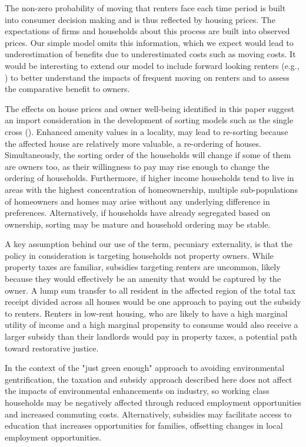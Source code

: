 \documentclass[ecta,nameyear,draft]{econsocart}
\theoremstyle{plain}
\theoremstyle{remark}
\begin{document}
The non-zero probability of moving that renters face each time period is built into consumer decision making and is thus reflected by housing prices. The expectations of firms and households about this process are built into observed prices. Our simple model omits this information, which we expect would lead to underestimation of benefits due to underestimated costs such as moving costs. It would be interesting to extend our model to include forward looking renters (e.g., \cite{bishop19}) to better understand the impacts of frequent moving on renters and to assess the comparative benefit to owners.  

The effects on house prices and owner well-being identified in this paper suggest an import consideration in the development of sorting models such as the single cross (\cite{banzhaf20}). Enhanced amenity values in a locality, may lead to re-sorting because the affected house are relatively more valuable, a re-ordering of houses. Simultaneously, the sorting order of the households will change if some of them are owners too, as their willingness to pay may rise enough to change the ordering of households. Furthermore, if higher income households tend to live in areas with the highest concentration of homeownership, multiple sub-populations of homeowners and homes may arise without any underlying difference in preferences. Alternatively, if households have already segregated based on ownership, sorting may be mature and household ordering may be stable.

A key assumption behind our use of the term, pecuniary externality, is that the policy in consideration is targeting households not property owners. While property taxes are familiar, subsidies targeting renters are uncommon, likely because they would effectively be an amenity that would be captured by the owner. A lump sum transfer to all resident in the affected region of the total tax receipt divided across all houses would be one approach to paying out the subsidy to renters. Renters in low-rent housing, who are likely to have a high marginal utility of income and a high marginal propensity to consume would also receive a larger subsidy than their landlords would pay in property taxes, a potential path toward restorative justice. 

In the context of the "just green enough" \cite{curran12} approach to avoiding environmental gentrification, the taxation and subsidy approach described here does not affect the impacts of environmental enhancements on industry, so working class households may be negatively affected through reduced employment opportunities and increased commuting costs. Alternatively, subsidies may facilitate access to education that increases opportunities for families, offsetting changes in local employment opportunities. 
\end{document}
